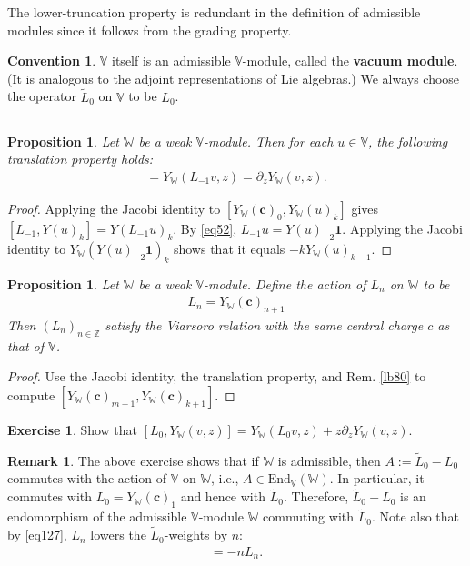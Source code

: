 \documentclass[12pt,a4paper,notitlepage]{article}
\theoremstyle{definition}
\newtheorem{exe}[df]{Exercise}
\newtheorem{rem}[df]{Remark}
\newtheorem{cv}[df]{Convention}
\theoremstyle{plain}
\newtheorem{pp}[df]{Proposition}
\newcommand{\wtd}{\widetilde}
\newcommand{\End}{\mathrm{End}} %
\newcommand{\id}{\mathbf{1}}
\newcommand{\Vbb}{\mathbb V}
\newcommand{\Wbb}{\mathbb W}
\newcommand{\Zbb}{\mathbb Z}
\newcommand{\cbf}{\mathbf c}
\numberwithin{equation}{section}
\begin{document}
The lower-truncation property is redundant in the definition of admissible modules since it follows from the grading property.

\begin{cv}
$\Vbb$ itself is an admissible $\Vbb$-module, called the \textbf{vacuum module}. (It is analogous to the adjoint representations of Lie algebras.) We always choose the operator $\wtd L_0$ on $\Vbb$ to be $L_0$.
\end{cv}


\subsection{}

\begin{pp}
Let $\Wbb$ be a weak $\Vbb$-module. Then for each $u\in\Vbb$, the following translation property holds:
\begin{align}
[L_{-1},Y_\Wbb(v,z)]=Y_\Wbb(L_{-1}v,z)=\partial_zY_\Wbb(v,z).	
\end{align}
\end{pp}
\begin{proof}
Applying the Jacobi identity to $[Y_\Wbb(\cbf)_0,Y_\Wbb(u)_k]$ gives $[L_{-1},Y(u)_k]=Y(L_{-1}u)_k$. By \eqref{eq52}, $L_{-1}u=Y(u)_{-2}\id$. Applying the Jacobi identity to $Y_\Wbb(Y(u)_{-2}\id)_k$ shows that it equals $-kY_\Wbb(u)_{k-1}$.
\end{proof}





\begin{pp}
Let $\Wbb$ be a weak $\Vbb$-module. Define the action of $L_n$ on $\Wbb$ to be
\begin{align}
L_n=Y_\Wbb(\cbf)_{n+1}	
\end{align}
Then $(L_n)_{n\in\Zbb}$ satisfy the Viarsoro relation with the same central charge $c$ as that of $\Vbb$.
\end{pp}
\begin{proof}
Use the Jacobi identity, the translation property, and Rem. \ref{lb80} to compute $[Y_\Wbb(\cbf)_{m+1},Y_\Wbb(\cbf)_{k+1}]$.
\end{proof}

\begin{exe}
Show that $[L_0,Y_\Wbb(v,z)]=Y_\Wbb(L_0v,z)+z\partial_zY_\Wbb(v,z)$.
\end{exe}

\begin{rem}\label{lb81}
The above exercise shows that if $\Wbb$ is admissible, then $A:=\wtd L_0-L_0$ commutes with the action of $\Vbb$ on $\Wbb$, i.e., $A\in\End_\Vbb(\Wbb)$. In particular, it commutes with $L_0=Y_\Wbb(\cbf)_1$ and hence with $\wtd L_0$. Therefore, $\wtd L_0-L_0$ is an endomorphism of the admissible $\Vbb$-module $\Wbb$ commuting with $\wtd L_0$. Note also that by \eqref{eq127}, $L_n$ lowers the $\wtd L_0$-weights by $n$:
\begin{align}
[\wtd L_0,L_n]=-nL_n.\label{eq134}	
\end{align}
\end{rem}
\end{document}
